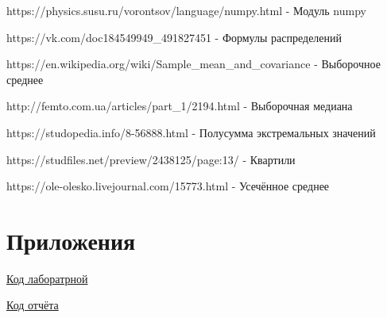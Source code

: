 \documentclass[a4]{article}
\begin{document}
\begin{thebibliography}{}
      https://physics.susu.ru/vorontsov/language/numpy.html  -  Модуль numpy
    
      https://vk.com/doc184549949\_491827451  -  Формулы распределений
    
      https://en.wikipedia.org/wiki/Sample\_mean\_and\_covariance  -  Выборочное среднее
    
      http://femto.com.ua/articles/part\_1/2194.html  -  Выборочная медиана
    
      https://studopedia.info/8-56888.html  -  Полусумма экстремальных значений
    
      https://studfiles.net/preview/2438125/page:13/  -  Квартили
    
      https://ole-olesko.livejournal.com/15773.html  -  Усечённое среднее
\end{thebibliography}

\section{Приложения}

\href{https://github.com/MisterProper9000/MatStatLabs/blob/master/MatStatLab2/MatStatLab2.py}{Код лаборатрной}

\href{https://github.com/MisterProper9000/MatStatLabs/blob/master/MatStatLab2/MatStatLab2.tex}{Код отчёта}
\end{document}
